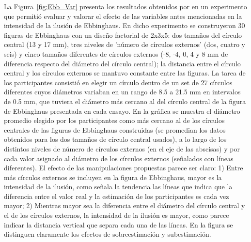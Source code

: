 La Figura~\ref{fig:Ebb_Var} presenta los resultados obtenidos por \parencite{Massaro1971} en un experimento que permitió evaluar y valorar el efecto de las variables antes mencionadas en la intensidad de la ilusión de Ebbinghaus. En dicho experimento se construyeron 30 figuras de Ebbinghaus con un diseño factorial de 2x3x5: dos tamaños del círculo central (13 y 17 mm), tres niveles de 'número de círculos externos' (dos, cuatro y seis) y cinco tamaños diferentes de círculos externos (-8, -4, 0, 4 y 8 mm de diferencia respecto del diámetro del círculo central); la distancia entre el círculo central y los círculos externos se mantuvo constante entre las figuras. La tarea de los participantes consistió en elegir un círculo dentro de un set de 27 círculos diferentes cuyos diámetros variaban en un rango de 8.5 a 21.5 mm en intervalos de 0.5 mm, que tuviera el diámetro más cercano al del círculo central de la figura de Ebbinghaus presentada en cada ensayo. En la gráfica se muestra el diámetro promedio elegido por los participantes como más cercano al de los círculos centrales de las figuras de Ebbinghaus construidas (se promedian los datos obtenidos para los dos tamaños de círculo central usados), a lo largo de los distintos niveles de número de círculos externos (en el eje de las abscisas) y por cada valor asignado al diámetro de los círculos externos (señalados con líneas diferentes). El efecto de las manipulaciones propuestas parece ser claro: 1) Entre más círculos externos se incluyen en la figura de Ebbinghaus, mayor es la intensidad de la ilusión, como señala la tendencia las líneas que indica que la diferencia entre el valor real y la estimación de los participantes es cada vez mayor; 2) Mientras mayor sea la diferencia entre el diámetro del círculo central y el de los círculos externos, la intensidad de la ilusión es mayor, como parece indicar la distancia vertical que separa cada una de las líneas. En la figura se distinguen claramente los efectos de sobreestimación y subestimación.\\

